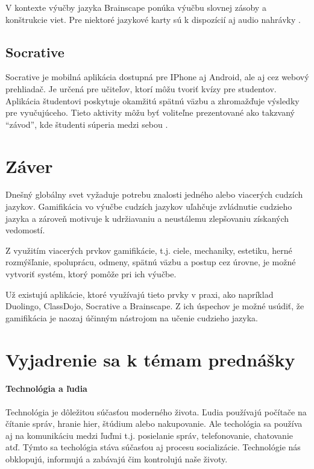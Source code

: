 \documentclass[10pt,twoside,slovak,a4paper]{article}
\begin{document}
V kontexte výučby jazyka Brainscape ponúka výučbu slovnej zásoby a konštrukcie viet. Pre niektoré jazykové karty sú k dispozícií aj audio nahrávky \cite{Prathyusha}.

\subsection{Socrative}
Socrative je mobilná aplikácia dostupná pre IPhone aj Android, ale aj cez webový prehliadač. Je určená pre učiteľov, ktorí môžu tvoriť kvízy pre studentov. Aplikácia študentovi poskytuje okamžitú spätnú väzbu a zhromažďuje výsledky pre vyučujúceho. 
Tieto aktivity môžu byť voliteľne prezentované ako takzvaný “závod”, kde študenti súperia medzi sebou \cite{Socrative}.


\section{Záver} \label{zaver} %
Dnešný globálny svet vyžaduje potrebu znalosti jedného alebo viacerých cudzích jazykov. Gamifikácia vo výučbe cudzích jazykov uľahčuje zvládnutie cudzieho jazyka a zároveň  motivuje k udržiavaniu a neustálemu zlepšovaniu získaných vedomostí.

Z využitím viacerých prvkov gamifikácie, t.j. ciele, mechaniky, estetiku, herné rozmýšľanie, spoluprácu, odmeny, spätnú väzbu a postup cez úrovne, je možné vytvoriť systém, ktorý pomôže pri ich výučbe.

Už existujú aplikácie, ktoré využívajú tieto prvky v praxi, ako napríklad Duolingo, ClassDojo, Socrative a Brainscape. Z ich úspechov je možné usúdiť, že gamifikácia je naozaj účinným nástrojom na učenie cudzieho jazyka.


\section*{Vyjadrenie sa k témam prednášky}

\paragraph{Technológia a ľudia}
Technológia je dôležitou súčasťou moderného života. Ľudia používajú počítače na čítanie správ, hranie hier, štúdium alebo nakupovanie. Ale techológia sa používa aj na komunikáciu medzi ľuďmi t.j. posielanie správ, telefonovanie, chatovanie atď. Týmto sa techológia stáva súčasťou aj procesu socializácie. Technológie nás obklopujú, informujú a zabávajú čim kontrolujú naše životy.
\end{document}
